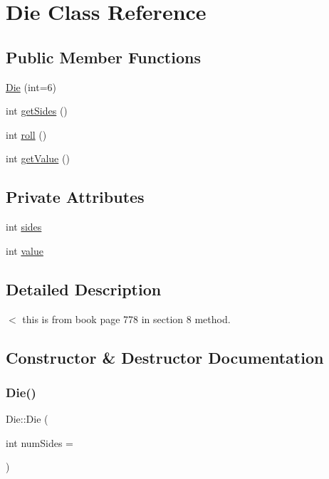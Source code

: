 \hypertarget{class_die}{}\section{Die Class Reference}
\label{class_die}
\subsection*{Public Member Functions}
\begin{DoxyCompactItemize}
\item 
\mbox{\hyperlink{class_die_ab5220cf1410b2fa51612f4228e283588}{Die}} (int=6)
\item 
int \mbox{\hyperlink{class_die_a481ebbb00f5a00163bbf83ff44b13b62}{get\+Sides}} ()
\item 
int \mbox{\hyperlink{class_die_ad62b97478af1158dabe114c486f6824d}{roll}} ()
\item 
int \mbox{\hyperlink{class_die_a0a76a3172b8dc96e33f78482cf5f0cd6}{get\+Value}} ()
\end{DoxyCompactItemize}
\subsection*{Private Attributes}
\begin{DoxyCompactItemize}
\item 
int \mbox{\hyperlink{class_die_a97326323d9e997c9e7ee077ca250a080}{sides}}
\item 
int \mbox{\hyperlink{class_die_a1d3d92c57a6d515d93162af0ca6b3e1d}{value}}
\end{DoxyCompactItemize}


\subsection{Detailed Description}
$<$ this is from book page 778 in section 8 method. 

\subsection{Constructor \& Destructor Documentation}
\mbox{\label{class_die_ab5220cf1410b2fa51612f4228e283588}} 
\subsubsection{\texorpdfstring{Die()}{Die()}}
{\footnotesize\ttfamily Die\+::\+Die (\begin{DoxyParamCaption}\item[{int}]{num\+Sides = {} }\end{DoxyParamCaption})}


